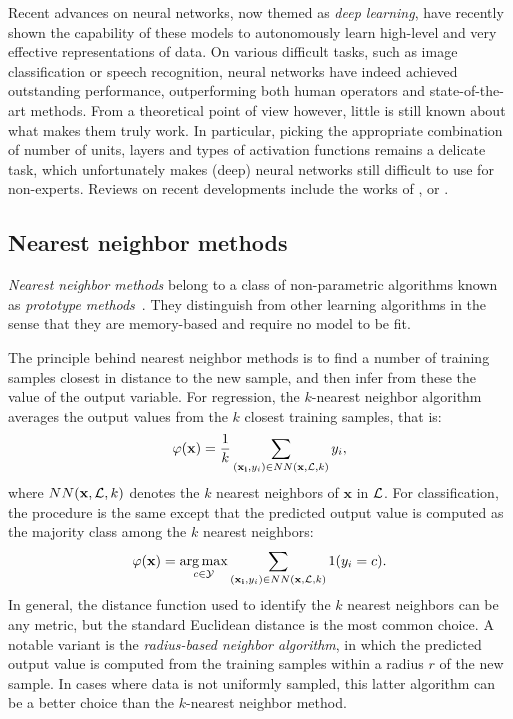 Recent advances on neural networks, now themed as \textit{deep learning}, have
recently shown the capability of these models to autonomously learn high-level
and very effective representations of data. On various difficult tasks, such as
image classification or speech recognition, neural networks have indeed
achieved outstanding performance, outperforming both human operators and
state-of-the-art methods. From a theoretical point of view however, little is
still known about what makes them truly work. In particular, picking the
appropriate combination of number of units, layers and types of activation
functions remains a delicate task, which unfortunately makes (deep) neural
networks still difficult to use for non-experts. Reviews on recent developments
include the works of \citet{hinton:2007}, \citet{arel:2010} or \citet{bengio:2013}.


\subsection{Nearest neighbor methods}

\textit{Nearest neighbor methods} belong to a class of non-parametric algorithms
known as \textit{prototype methods}~\citep{hastie:2005}. They distinguish from
other learning algorithms in the sense that they are memory-based and require
no model to be fit.

The principle behind nearest neighbor methods is to find a number of
training samples closest in distance to the new sample, and then infer from
these the value of the output variable. For regression, the $k$-nearest
neighbor algorithm~\citep{fix:1951} averages the output values from the $k$
closest training samples, that is:
\begin{equation}
\varphi(\mathbf{x}) = \frac{1}{k} \sum_{(\mathbf{x_i}, y_i) \in NN(\mathbf{x}, {\cal L}, k)} y_i,
\end{equation}
where $NN(\mathbf{x}, {\cal L}, k)$ denotes the $k$ nearest neighbors of ${\mathbf{x}}$ in ${\cal L}$.
For classification, the procedure is the same except that the predicted
output value is computed as the majority class among the $k$ nearest neighbors:
\begin{equation}
\varphi(\mathbf{x}) = \operatorname*{arg\,max}_{c \in {\cal Y}} \sum_{(\mathbf{x_i}, y_i) \in NN(\mathbf{x}, {\cal L}, k)} 1(y_i = c).
\end{equation}
In general, the distance function used to identify the $k$ nearest neighbors
can be any metric, but the standard Euclidean distance is the most common
choice. A notable variant is the
\textit{radius-based neighbor algorithm}, in which the predicted output value
is computed from the training samples within a radius $r$ of the new sample.
In cases where data is not uniformly sampled, this latter algorithm can be
a better choice than the $k$-nearest neighbor method.

